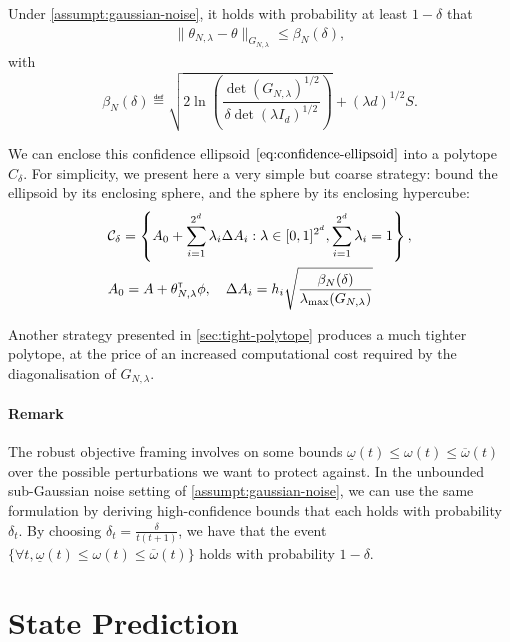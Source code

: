 \documentclass{article}
\begin{document}
\begin{theorem}
\label{thm:confidence_ellipsoid}
Under \autoref{assumpt:gaussian-noise}, it holds with probability at least $1-\delta$ that
\begin{align}
    \label{eq:confidence-ellipsoid}
    \| \theta_{N,\lambda}  - \theta\|_{G_{N,\lambda}} \leq \beta_N(\delta),
\end{align}
with
\begin{equation}
    \beta_N(\delta)\eqdef \sqrt{2\ln \left(\frac{\det(G_{N,\lambda})^{1/2}}{\delta\det(\lambda I_d)^{1/2}}\right)}
     + (\lambda d)^{1/2}S.
\end{equation}
\end{theorem}

We can enclose this confidence ellipsoid $\eqref{eq:confidence-ellipsoid}$ into a polytope $C_\delta$. For simplicity, we present here a very simple but coarse strategy: bound the ellipsoid by its enclosing sphere, and the sphere by its enclosing hypercube:
\begin{align}
    \label{eq:generic-polytope}
     &\mathcal{C}_\delta = \left\{ A_{0}+\sum_{i=1}^{2^d}\lambda_{i}\Delta A_{i}: \lambda\in[0, 1]^{2^d},  \sum_{i=1}^{2^d}\lambda_{i}=1\right\},\\
     &A_0 = A + \theta_{N,\lambda}^{\mathsf{\scriptscriptstyle T}}\phi, \quad\Delta A_{i} = h_i \sqrt{\frac{\beta_N(\delta)}{\lambda_{\max}(G_{N,\lambda})}}
\end{align}

Another strategy presented in \autoref{sec:tight-polytope} produces a much tighter polytope, at the price of an increased computational cost required by the diagonalisation of $G_{N,\lambda}$.

\paragraph{Remark} The robust objective framing involves on some bounds $\underline{\omega}(t)\leq \omega(t) \leq \overline{\omega}(t)$ over the possible perturbations we want to protect against. In the unbounded sub-Gaussian noise setting of \autoref{assumpt:gaussian-noise}, we can use the same formulation by deriving high-confidence bounds that each holds with probability $\delta_t$. By choosing $\delta_t = \frac{\delta}{t(t+1)}$, we have that the event $\{\forall t, \underline{\omega}(t) \leq \omega(t) \leq \overline{\omega}(t)\}$ holds with probability $1-\delta$.

\section{State Prediction}
\end{document}
